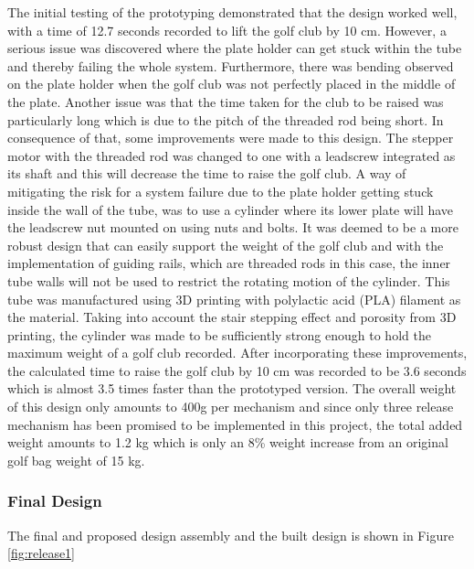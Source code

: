 \documentclass[11pt,landscape]{article}
\begin{document}
\begin{multicols}{2}
    The initial testing of the prototyping demonstrated that the design worked
    well, with a time of 12.7 seconds recorded to lift the golf club by 10 cm.
    However, a serious issue was discovered where the plate holder can get stuck
    within the tube and thereby failing the whole system. Furthermore, there was
    bending observed on the plate holder when the golf club was not perfectly
    placed in the middle of the plate. Another issue was that the time taken for
    the club to be raised was particularly long which is due to the pitch of the
    threaded rod being short. In consequence of that, some improvements were
    made to this design. The stepper motor with the threaded rod was changed to
    one with a leadscrew integrated as its shaft and this will decrease the time
    to raise the golf club.  A way of mitigating the risk for a system failure
    due to the plate holder getting stuck inside the wall of the tube, was to
    use a cylinder where its lower plate will have the leadscrew nut mounted on
    using nuts and bolts. It was deemed to be a more robust design that can
    easily support the weight of the golf club and with the implementation of
    guiding rails, which are threaded rods in this case, the inner tube walls
    will not be used to restrict the rotating motion of the cylinder. This tube
    was manufactured using 3D printing with polylactic acid (PLA) filament as
    the material. Taking into account the stair stepping effect and porosity
    from 3D printing, the cylinder was made to be sufficiently strong enough to
    hold the maximum weight of a golf club recorded. After incorporating these
    improvements, the calculated time to raise the golf club by 10 cm was
    recorded to be 3.6 seconds which is almost 3.5 times faster than the
    prototyped version. The overall weight of this design only amounts to 400g
    per mechanism and since only three release mechanism has been promised to be
    implemented in this project, the total added weight amounts to 1.2 kg which
    is only an 8\% weight increase from an original golf bag weight of 15 kg. 
    
    
    \subsubsection{Final Design}
    The final and proposed design assembly and the built design is shown in
    Figure \ref{fig:release1}
    

\end{multicols}
\end{document}
